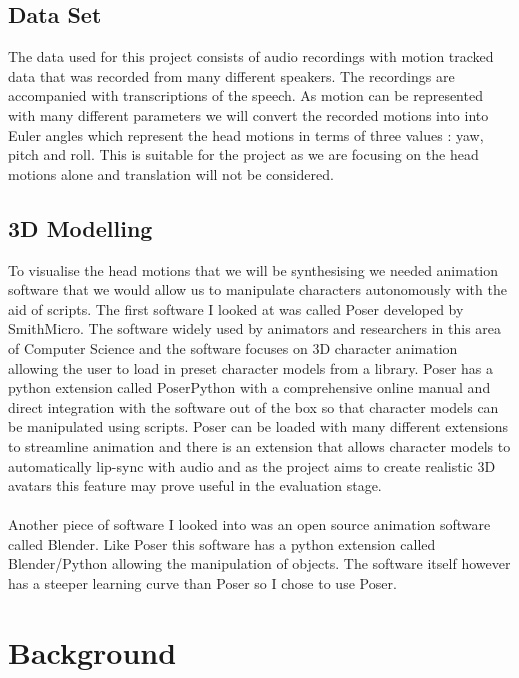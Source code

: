 \documentclass[bsc,frontabs,twoside,singlespacing,parskip]{infthesis}
\begin{document}
\section{Data Set}
The data used for this project consists of audio recordings with motion tracked data that was recorded from many different speakers. The recordings are accompanied with transcriptions of the speech. As motion can be represented with many different parameters we will convert the recorded motions into into Euler angles which represent the head motions in terms of three values : yaw, pitch and roll. This is suitable for the project as we are focusing on the head motions alone and translation will not be considered.
\section{3D Modelling}
To visualise the head motions that we will be synthesising we needed animation software that we would allow us to manipulate characters autonomously with the aid of scripts. The first software I looked at was called Poser developed by SmithMicro. The software widely used by animators and researchers in this area of Computer Science and the software focuses on 3D character animation allowing the user to load in preset character models from a library. Poser has a python extension called PoserPython with a comprehensive online manual and direct integration with the software out of the box so that character models can be manipulated using scripts. Poser can be loaded with many different extensions to streamline animation and there is an extension that allows character models to automatically lip-sync with audio and as the project aims to create realistic 3D avatars this feature may prove useful in the evaluation stage.
\\
\\
Another piece of software I looked into was an open source animation software called Blender. Like Poser this software has a python extension called Blender/Python allowing the manipulation of objects. The software itself however has a steeper learning curve than Poser so I chose to use Poser.
\chapter{Background}
\end{document}
